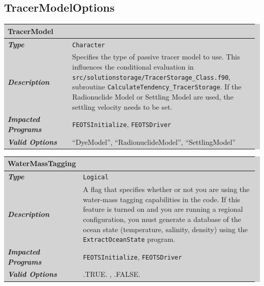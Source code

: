 \documentclass{softwaremanual}
\begin{document}
\subsection{TracerModelOptions}

\noindent\begingroup\setlength{\fboxsep}{0pt}
\colorbox{lightgray}{
\begin{tabular}{p{0.25\linewidth} p{0.725\linewidth}}
\toprule
\textbf{TracerModel} & \\
\midrule
\textbf{\textit{Type}} & \texttt{Character} \\
\midrule
\textbf{\textit{Description}} & Specifies the type of passive tracer model to use. This influences the conditional evaluation in \texttt{src/solutionstorage/TracerStorage\_Class.f90}, subroutine \texttt{CalculateTendency\_TracerStorage}. If the Radionuclide Model or Settling Model are used, the settling velocity needs to be set. \\
\midrule
\textbf{\textit{Impacted Programs}} & \texttt{FEOTSInitialize}, \texttt{FEOTSDriver} \\
\midrule
\textbf{\textit{Valid Options}}  & ``DyeModel'', ``RadionuclideModel'', ``SettlingModel'' \\
\bottomrule
\end{tabular}
}\endgroup

\noindent\begingroup\setlength{\fboxsep}{0pt}
\colorbox{lightgray}{
\begin{tabular}{p{0.25\linewidth} p{0.725\linewidth}}
\toprule
\textbf{WaterMassTagging} & \\
\midrule
\textbf{\textit{Type}} & \texttt{Logical} \\
\midrule
\textbf{\textit{Description}} & A flag that specifies whether or not you are using the water-mass tagging capabilities in the code. If this feature is turned on and you are running a regional configuration, you must generate a database of the ocean state (temperature, salinity, density) using the \texttt{ExtractOceanState} program. \\
\midrule
\textbf{\textit{Impacted Programs}} & \texttt{FEOTSInitialize}, \texttt{FEOTSDriver} \\
\midrule
\textbf{\textit{Valid Options}}  & .TRUE. , .FALSE. \\
\bottomrule
\end{tabular}
}\endgroup
\end{document}
